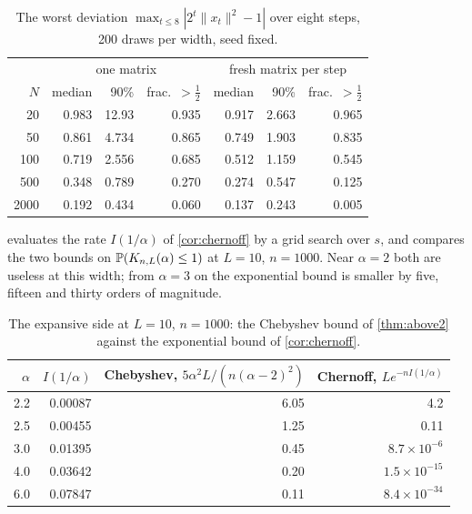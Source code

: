 \begin{table}[h]\centering
\begin{tabular}{rrrrrrr}
\toprule
 & \multicolumn{3}{c}{one matrix} & \multicolumn{3}{c}{fresh matrix per step}\\
$N$ & median & 90\% & frac.\ $>\tfrac12$ & median & 90\% & frac.\ $>\tfrac12$\\
\midrule
20 & 0.983 & 12.93 & 0.935 & 0.917 & 2.663 & 0.965\\
50 & 0.861 & 4.734 & 0.865 & 0.749 & 1.903 & 0.835\\
100 & 0.719 & 2.556 & 0.685 & 0.512 & 1.159 & 0.545\\
500 & 0.348 & 0.789 & 0.270 & 0.274 & 0.547 & 0.125\\
2000 & 0.192 & 0.434 & 0.060 & 0.137 & 0.243 & 0.005\\
\bottomrule
\end{tabular}
\caption{The worst deviation $\max_{t\le8}|2^t\|x_t\|^2-1|$ over eight steps, 200 draws per width, seed fixed.}
\label{tab:horizon}
\end{table}

 evaluates the rate $I(1/\alpha)$ of \cref{cor:chernoff} by a grid search over $s$, and compares the two bounds on $\mathbb{P}(K_{n,L}(\alpha)\le1)$ at $L=10$, $n=1000$. Near $\alpha=2$ both are useless at this width; from $\alpha=3$ on the exponential bound is smaller by five, fifteen and thirty orders of magnitude.

\begin{table}[h]\centering
\begin{tabular}{rrrr}
\toprule
$\alpha$ & $I(1/\alpha)$ & Chebyshev, $5\alpha^2L/(n(\alpha-2)^2)$ & Chernoff, $Le^{-nI(1/\alpha)}$\\
\midrule
2.2 & 0.00087 & 6.05 & 4.2\\
2.5 & 0.00455 & 1.25 & 0.11\\
3.0 & 0.01395 & 0.45 & $8.7\times10^{-6}$\\
4.0 & 0.03642 & 0.20 & $1.5\times10^{-15}$\\
6.0 & 0.07847 & 0.11 & $8.4\times10^{-34}$\\
\bottomrule
\end{tabular}
\caption{The expansive side at $L=10$, $n=1000$: the Chebyshev bound of \cref{thm:above2} against the exponential bound of \cref{cor:chernoff}.}
\label{tab:chernoff}
\end{table}
